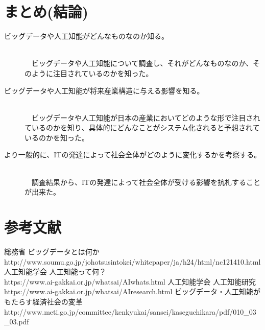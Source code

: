 \documentclass[a4paper,12pt]{jarticle}
\begin{document}
\section{まとめ(結論)}
\begin{description}
 \item[ビッグデータや人工知能がどんなものなのか知る。]\mbox\\\\
　ビッグデータや人工知能について調査し、それがどんなものなのか、そのように注目されているのかを知った。
 \item[ビッグデータや人工知能が将来産業構造に与える影響を知る。]\mbox\\\\
　ビッグデータや人工知能が日本の産業においてどのような形で注目されているのかを知り、具体的にどんなことがシステム化されると予想されているのかを知った。
 \item[より一般的に、ITの発達によって社会全体がどのように変化するかを考察する。]\mbox\\\\
　調査結果から、ITの発達によって社会全体が受ける影響を抗札することが出来た。 
\end{description}
\section{参考文献}
\begin{thebibliography}{99}
  総務省 ビッグデータとは何か\\
http://www.soumu.go.jp/johotsusintokei/whitepaper/ja/h24/html/nc121410.html
  人工知能学会 人工知能って何？\\
https://www.ai-gakkai.or.jp/whatsai/AIwhats.html
  人工知能学会 人工知能研究\\
https://www.ai-gakkai.or.jp/whatsai/AIresearch.html
  ビッグデータ・人工知能がもたらす経済社会の変革\\
http://www.meti.go.jp/committee/kenkyukai/sansei/kaseguchikara/pdf/010\_03\_03.pdf
\end{thebibliography}
\end{document}
